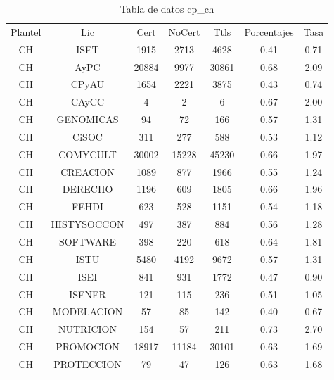\documentclass[12pt]{article}
\begin{document}
\begin{table}[h]
\centering
\begin{tabular}{ccccccc}

Plantel & Lic & Cert & NoCert & Ttls & Porcentajes & Tasa \\

CH & ISET & 1915 & 2713 & 4628 & 0.41 & 0.71 \\
CH & AyPC & 20884 & 9977 & 30861 & 0.68 & 2.09 \\
CH & CPyAU & 1654 & 2221 & 3875 & 0.43 & 0.74 \\
CH & CAyCC & 4 & 2 & 6 & 0.67 & 2.00 \\
CH & GENOMICAS & 94 & 72 & 166 & 0.57 & 1.31 \\
CH & CiSOC & 311 & 277 & 588 & 0.53 & 1.12 \\
CH & COMYCULT & 30002 & 15228 & 45230 & 0.66 & 1.97 \\
CH & CREACION & 1089 & 877 & 1966 & 0.55 & 1.24 \\
CH & DERECHO & 1196 & 609 & 1805 & 0.66 & 1.96 \\
CH & FEHDI & 623 & 528 & 1151 & 0.54 & 1.18 \\
CH & HISTYSOCCON & 497 & 387 & 884 & 0.56 & 1.28 \\
CH & SOFTWARE & 398 & 220 & 618 & 0.64 & 1.81 \\
CH & ISTU & 5480 & 4192 & 9672 & 0.57 & 1.31 \\
CH & ISEI & 841 & 931 & 1772 & 0.47 & 0.90 \\
CH & ISENER & 121 & 115 & 236 & 0.51 & 1.05 \\
CH & MODELACION & 57 & 85 & 142 & 0.40 & 0.67 \\
CH & NUTRICION & 154 & 57 & 211 & 0.73 & 2.70 \\
CH & PROMOCION & 18917 & 11184 & 30101 & 0.63 & 1.69 \\
CH & PROTECCION & 79 & 47 & 126 & 0.63 & 1.68 \\

\end{tabular}
\caption{Tabla de datos cp\_ch}
\end{table}
\end{document}
